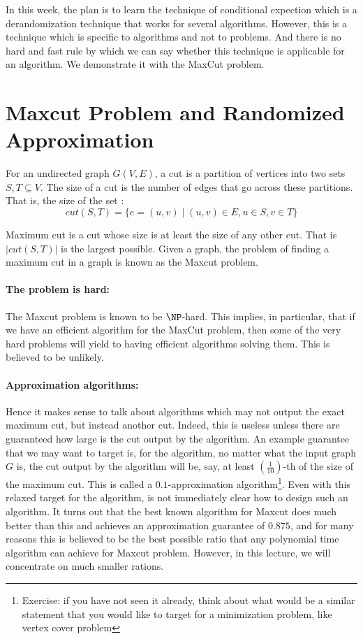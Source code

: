 

In this week, the plan is to learn the technique of conditional expection which is a derandomization technique that works for several algorithms. However, this is a technique which is specific to algorithms and not to problems. And there is no hard and fast rule by which we can say whether this technique is applicable for an algorithm. We demonstrate it with the {\sc MaxCut} problem.

\section{{\sc Maxcut} Problem and Randomized Approximation}

For an undirected graph $G(V,E)$, a cut is a partition of vertices into two sets $S,T \subseteq V$. The size of a cut is the number of edges that go across these partitions. That is, the size of the set :
$$cut(S,T) = \{ e=(u,v) \mid (u,v) \in E, u \in S, v \in T \}$$

Maximum cut is a cut whose size is at least the size of any other cut. That is $|cut(S,T)|$ is the largest possible. Given a graph, the problem of finding a maximum cut in a graph is known as the {\sc Maxcut} problem.

\paragraph*{The problem is hard:} The {\sc Maxcut} problem is known to be $\NP$-hard. This implies, in particular, that if we have an efficient algorithm for the {\sc MaxCut} problem, then some of the very hard problems will yield to having efficient algorithms solving them. This is believed to be unlikely. \\[-9mm]

\paragraph*{Approximation algorithms: }Hence it makes sense to talk about algorithms which may not output the exact maximum cut, but instead another cut. Indeed, this is useless unless there are guaranteed how large is the cut output by the algorithm. An example guarantee that we may want to target is, for the algorithm, no matter what the input graph $G$ is, the cut output by the algorithm will be, say, at least $\left(\frac{1}{10}\right)$-th of the size of the maximum cut. This is called a $0.1$-approximation algorithm\footnote{Exercise: if you have not seen it already, think about what would be a similar statement that you would like to target for a minimization problem, like vertex cover problem}. Even with this relaxed target for the algorithm, is not immediately clear how to design such an algorithm. It turns out that the best known algorithm for {\sc Maxcut} does much better than this and achieves an approximation guarantee of $0.875$, and for many reasons this is believed to be the best possible ratio that any polynomial time algorithm can achieve for {\sc Maxcut} problem. However, in this lecture, we will concentrate on much smaller rations. \\[-9mm]

